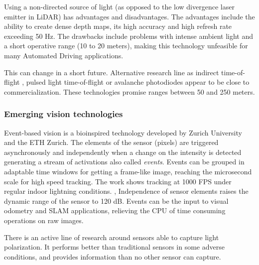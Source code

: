 Using a non-directed source of light (as opposed to the low divergence laser
emitter in LiDAR) has advantages and disadvantages. 
The advantages include the ability to create dense depth maps, its high 
accuracy and high refresh rate exceeding 50 Hz. The drawbacks include 
problems with intense ambient light and a short operative range (10 to 20 
meters), making this technology unfeasible for many Automated 
Driving applications.

This can change in a short future. Alternative research line as indirect
time-of-flight \cite{Villa2017}, pulsed light time-of-flight or avalanche
photodiodes \cite{Panasonic2018} appear to be close to commercialization. 
These technologies promise ranges between 50 and 250 meters.
    


\subsubsection{Emerging vision technologies}

Event-based vision is a bioinspired technology developed by Zurich University
and the ETH Zurich. The elements of the sensor (pixels) are triggered 
asynchronously and independently when a change on the intensity is detected 
generating a stream of activations also called \emph{events}. 
Events can be grouped in adaptable time windows for getting a frame-like image,
reaching the microsecond scale for high speed tracking. 
The work \cite{Mueggler2014} shows tracking at 1000 FPS under regular indoor 
lightning conditions. , 
Independence of sensor elements raises the dynamic range of the sensor to 
120 dB. 
Events can be the input to visual odometry \cite{Censi2014} and SLAM
\cite{Vidal2017} applications, relieving the CPU of time consuming operations
on raw images. 

There is an active line of research \cite{Garcia2018} around sensors able to
capture light polarization. It performs better than traditional sensors in
some adverse conditions, and provides information than no other sensor can 
capture.
 

